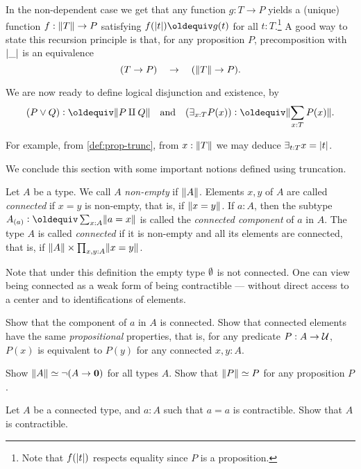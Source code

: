 In the non-dependent case we get that
any function $g: T\to P$ yields a (unique) function $f:\lVert T\rVert\to P$ 
satisfying $f(\trunc{t})\jdeq g(t)$ for all $t:T$.\footnote{%
Note that $f(\lvert t\rvert)$ respects equality since $P$ is a proposition.}
A good way to state this recursion principle is that, 
for any proposition $P$, precomposition with $\lvert\_\rvert$ is an equivalence
\[
(T \to P) \quad \to \quad (\lVert T\rVert \to P).
\]

We are now ready to define logical disjunction and existence, by
\[
(P \vee Q) \defeq \Trunc{P \amalg Q} \quad\text{and}
\quad (\exists_{x:T} P(x)) \defeq \Trunc{\sum_{x:T}P(x)}.
\]

For example, from \cref{def:prop-trunc}, from $x:\lVert T\rVert$ we may deduce $\exists_{t:T} x=\lvert t\rvert$.

We conclude this section with some important notions defined using truncation.

\begin{definition}\label{def:connected}
Let $A$ be a type. We call $A$ \emph{non-empty} if $\lVert A\rVert$.
Elements $x,y$ of $A$ are called \emph{connected} if $x=y$ is
non-empty, that is, if $\lVert x=y\rVert$.
If $a:A$, then the subtype $A_{(a)}\defeq \sum_{x:A}\Trunc{a=x}$
is called the \emph{connected component} of $a$ in $A$.
The type $A$ is called \emph{connected} if it is non-empty
and all its elements are connected, that is, if 
$\lVert A\rVert \times \prod_{x,y:A} \lVert x=y\rVert$.
\end{definition}

Note that under this definition the empty type $\emptyset$ is not connected.
One can view being connected as a weak form
of being contractible --- without direct access to a center and to
identifications of elements.

\begin{xca}\label{xca:component-connected}
Show that the component of $a$ in $A$ is connected.
Show that connected elements have the same 
\emph{propositional} properties, that is, 
for any predicate $P:A\to\mathcal{U}$, $P(x)$ is equivalent
to $P(y)$ for any connected $x,y:A$. 
\end{xca}

\begin{xca}\label{xca:trunc-non-empty}
Show $\lVert A\rVert \simeq \neg(A\to\mathbf{0})$ for all types $A$.
Show that $\lVert P\rVert \simeq P$ for any proposition $P$.
\end{xca}

\begin{xca}\label{xca:connected-loop-contractible}
Let $A$ be a connected type, and $a:A$ such that $a=a$ is contractible.
Show that $A$ is contractible.
\end{xca}

